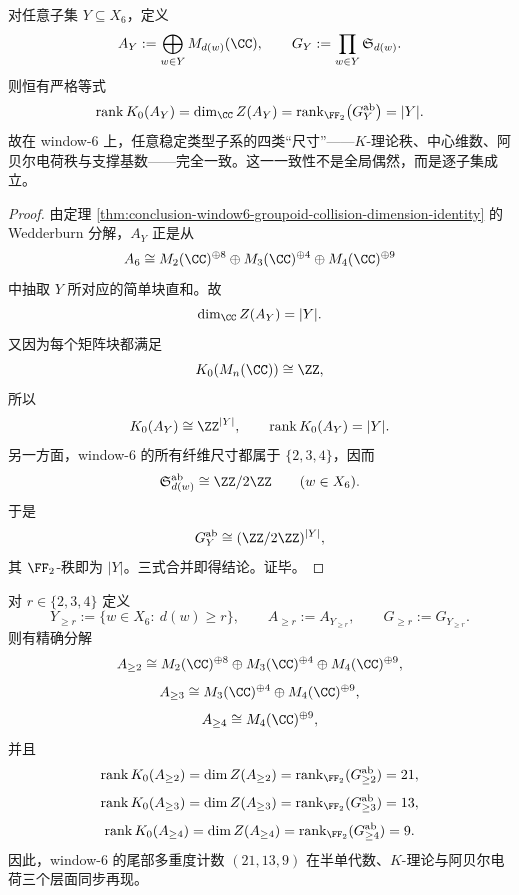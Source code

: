 \begin{theorem}\label{thm:conclusion-window6-local-support-ideal-four-rank-consistency}
对任意子集 \(Y\subseteq X_6\)，定义
\[
A_Y:=\bigoplus_{w\in Y}M_{d(w)}(\CC),
\qquad
G_Y:=\prod_{w\in Y}\mathfrak S_{d(w)}.
\]
则恒有严格等式
\[
\operatorname{rank}K_0(A_Y)
=
\dim_{\CC}Z(A_Y)
=
\operatorname{rank}_{\FF_2}\bigl(G_Y^{\mathrm{ab}}\bigr)
=
|Y|.
\]
故在 window-\(6\) 上，任意稳定类型子系的四类“尺寸”——\(K\)-理论秩、中心维数、阿贝尔电荷秩与支撑基数——完全一致。这一一致性不是全局偶然，而是逐子集成立。
\end{theorem}

\begin{proof}
由定理 \ref{thm:conclusion-window6-groupoid-collision-dimension-identity} 的 Wedderburn 分解，\(A_Y\) 正是从
\[
A_6\cong M_2(\CC)^{\oplus 8}\oplus M_3(\CC)^{\oplus 4}\oplus M_4(\CC)^{\oplus 9}
\]
中抽取 \(Y\) 所对应的简单块直和。故
\[
\dim_{\CC}Z(A_Y)=|Y|.
\]
又因为每个矩阵块都满足
\[
K_0(M_n(\CC))\cong \ZZ,
\]
所以
\[
K_0(A_Y)\cong \ZZ^{|Y|},
\qquad
\operatorname{rank}K_0(A_Y)=|Y|.
\]
另一方面，window-\(6\) 的所有纤维尺寸都属于 \(\{2,3,4\}\)，因而
\[
\mathfrak S_{d(w)}^{\mathrm{ab}}\cong \ZZ/2\ZZ
\qquad (w\in X_6).
\]
于是
\[
G_Y^{\mathrm{ab}}\cong (\ZZ/2\ZZ)^{|Y|},
\]
其 \(\FF_2\)-秩即为 \(|Y|\)。三式合并即得结论。证毕。
\end{proof}

\begin{proposition}\label{prop:conclusion-window6-threshold-filtration-semisimple-rank-ladder}
对 \(r\in\{2,3,4\}\) 定义
\[
Y_{\ge r}:=\{w\in X_6:\ d(w)\ge r\},
\qquad
A_{\ge r}:=A_{Y_{\ge r}},
\qquad
G_{\ge r}:=G_{Y_{\ge r}}.
\]
则有精确分解
\[
A_{\ge2}\cong M_2(\CC)^{\oplus 8}\oplus M_3(\CC)^{\oplus 4}\oplus M_4(\CC)^{\oplus 9},
\]
\[
A_{\ge3}\cong M_3(\CC)^{\oplus 4}\oplus M_4(\CC)^{\oplus 9},
\]
\[
A_{\ge4}\cong M_4(\CC)^{\oplus 9},
\]
并且
\[
\operatorname{rank}K_0(A_{\ge2})
=
\dim Z(A_{\ge2})
=
\operatorname{rank}_{\FF_2}(G_{\ge2}^{\mathrm{ab}})
=21,
\]
\[
\operatorname{rank}K_0(A_{\ge3})
=
\dim Z(A_{\ge3})
=
\operatorname{rank}_{\FF_2}(G_{\ge3}^{\mathrm{ab}})
=13,
\]
\[
\operatorname{rank}K_0(A_{\ge4})
=
\dim Z(A_{\ge4})
=
\operatorname{rank}_{\FF_2}(G_{\ge4}^{\mathrm{ab}})
=9.
\]
因此，window-\(6\) 的尾部多重度计数 \((21,13,9)\) 在半单代数、\(K\)-理论与阿贝尔电荷三个层面同步再现。
\end{proposition}

